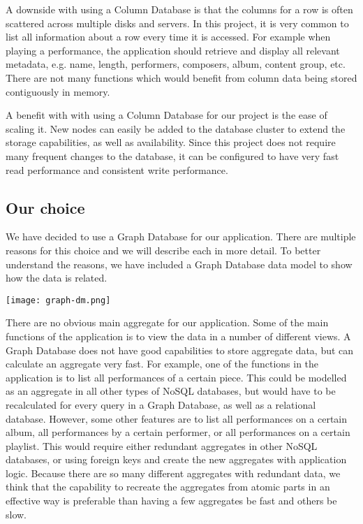 A downside with using a Column Database is that the columns for a row is often scattered across multiple disks and servers. In this project, it is very common to list all information about a row every time it is accessed. For example when playing a performance, the application should retrieve and display all relevant metadata, e.g. name, length, performers, composers, album, content group, etc. There are not many functions which would benefit from column data being stored contiguously in memory.

A benefit with with using a Column Database for our project is the ease of scaling it. New nodes can easily be added to the database cluster to extend the storage capabilities, as well as availability. Since this project does not require many frequent changes to the database, it can be configured to have very fast read performance and consistent write performance.

\subsection{Our choice}
We have decided to use a Graph Database for our application. There are multiple reasons for this
choice and we will describe each in more detail. To better understand the reasons, we have
included a Graph Database data model to show how the data is related.

\texttt{[image: graph-dm.png]}

There are no obvious main aggregate for our application. Some of the main functions of the
application is to view the data in a number of different views. A Graph Database does not have good
capabilities to store aggregate data, but can calculate an aggregate very fast. For example, one of
the functions in the application is to list all performances of a certain piece. This could be
modelled as an aggregate in all other types of NoSQL databases, but would have to be recalculated
for every query in a Graph Database, as well as a relational database. However, some other features
are to list all performances on a certain album, all performances by a certain performer, or all
performances on a certain playlist. This would require either redundant aggregates in other NoSQL
databases, or using foreign keys and create the new aggregates with application logic. Because there
are so many different aggregates with redundant data, we think that the capability to recreate the
aggregates from atomic parts in an effective way is preferable than having a few aggregates be fast
and others be slow.

